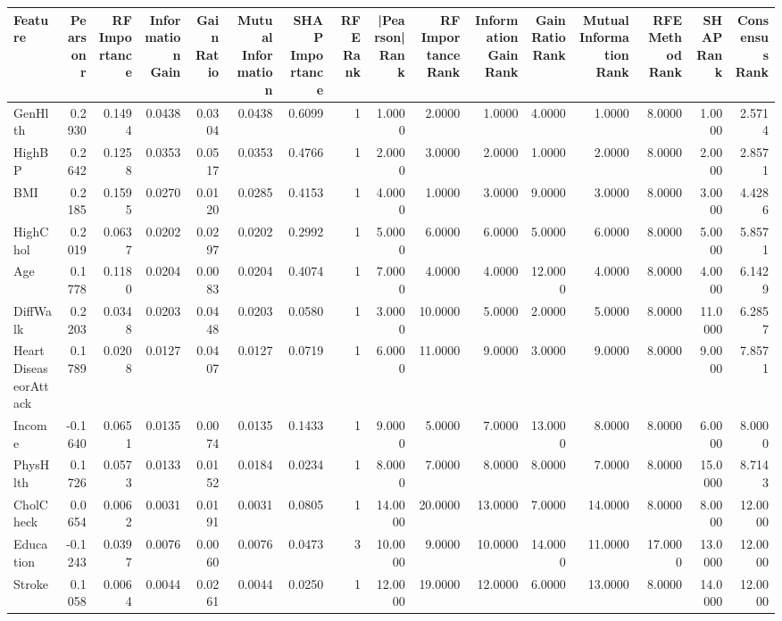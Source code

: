 \begin{tabular}{lrrrrrrrrrrrrrrr}
\toprule
Feature & Pearson r & RF Importance & Information Gain & Gain Ratio & Mutual Information & SHAP Importance & RFE Rank & |Pearson| Rank & RF Importance Rank & Information Gain Rank & Gain Ratio Rank & Mutual Information Rank & RFE Method Rank & SHAP Rank & Consensus Rank \\
\midrule
GenHlth & 0.2930 & 0.1494 & 0.0438 & 0.0304 & 0.0438 & 0.6099 & 1 & 1.0000 & 2.0000 & 1.0000 & 4.0000 & 1.0000 & 8.0000 & 1.0000 & 2.5714 \\
HighBP & 0.2642 & 0.1258 & 0.0353 & 0.0517 & 0.0353 & 0.4766 & 1 & 2.0000 & 3.0000 & 2.0000 & 1.0000 & 2.0000 & 8.0000 & 2.0000 & 2.8571 \\
BMI & 0.2185 & 0.1595 & 0.0270 & 0.0120 & 0.0285 & 0.4153 & 1 & 4.0000 & 1.0000 & 3.0000 & 9.0000 & 3.0000 & 8.0000 & 3.0000 & 4.4286 \\
HighChol & 0.2019 & 0.0637 & 0.0202 & 0.0297 & 0.0202 & 0.2992 & 1 & 5.0000 & 6.0000 & 6.0000 & 5.0000 & 6.0000 & 8.0000 & 5.0000 & 5.8571 \\
Age & 0.1778 & 0.1180 & 0.0204 & 0.0083 & 0.0204 & 0.4074 & 1 & 7.0000 & 4.0000 & 4.0000 & 12.0000 & 4.0000 & 8.0000 & 4.0000 & 6.1429 \\
DiffWalk & 0.2203 & 0.0348 & 0.0203 & 0.0448 & 0.0203 & 0.0580 & 1 & 3.0000 & 10.0000 & 5.0000 & 2.0000 & 5.0000 & 8.0000 & 11.0000 & 6.2857 \\
HeartDiseaseorAttack & 0.1789 & 0.0208 & 0.0127 & 0.0407 & 0.0127 & 0.0719 & 1 & 6.0000 & 11.0000 & 9.0000 & 3.0000 & 9.0000 & 8.0000 & 9.0000 & 7.8571 \\
Income & -0.1640 & 0.0651 & 0.0135 & 0.0074 & 0.0135 & 0.1433 & 1 & 9.0000 & 5.0000 & 7.0000 & 13.0000 & 8.0000 & 8.0000 & 6.0000 & 8.0000 \\
PhysHlth & 0.1726 & 0.0573 & 0.0133 & 0.0152 & 0.0184 & 0.0234 & 1 & 8.0000 & 7.0000 & 8.0000 & 8.0000 & 7.0000 & 8.0000 & 15.0000 & 8.7143 \\
CholCheck & 0.0654 & 0.0062 & 0.0031 & 0.0191 & 0.0031 & 0.0805 & 1 & 14.0000 & 20.0000 & 13.0000 & 7.0000 & 14.0000 & 8.0000 & 8.0000 & 12.0000 \\
Education & -0.1243 & 0.0397 & 0.0076 & 0.0060 & 0.0076 & 0.0473 & 3 & 10.0000 & 9.0000 & 10.0000 & 14.0000 & 11.0000 & 17.0000 & 13.0000 & 12.0000 \\
Stroke & 0.1058 & 0.0064 & 0.0044 & 0.0261 & 0.0044 & 0.0250 & 1 & 12.0000 & 19.0000 & 12.0000 & 6.0000 & 13.0000 & 8.0000 & 14.0000 & 12.0000 \\

\end{tabular}
